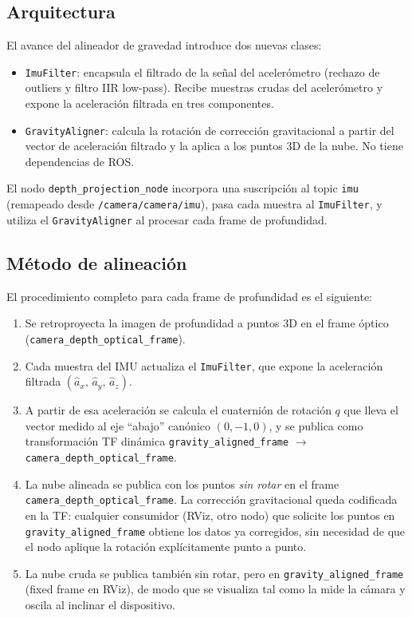 \subsection{Arquitectura}

El avance del alineador de gravedad introduce dos nuevas clases:

\begin{itemize}
  \item \texttt{ImuFilter}: encapsula el filtrado de la señal del
        acelerómetro (rechazo de outliers y filtro IIR low-pass). Recibe
        muestras crudas del acelerómetro y expone la aceleración filtrada
        en tres componentes.
  \item \texttt{GravityAligner}: calcula la rotación de corrección
        gravitacional a partir del vector de aceleración filtrado y la
        aplica a los puntos 3D de la nube. No tiene dependencias de ROS.
\end{itemize}

El nodo \texttt{depth\_projection\_node} incorpora una suscripción al
topic \texttt{imu} (remapeado desde \texttt{/camera/camera/imu}), pasa
cada muestra al \texttt{ImuFilter}, y utiliza el \texttt{GravityAligner}
al procesar cada frame de profundidad.

\subsection{Método de alineación}

El procedimiento completo para cada frame de profundidad es el siguiente:

\begin{enumerate}
  \item Se retroproyecta la imagen de profundidad a puntos 3D en el frame
        óptico (\texttt{camera\_depth\_optical\_frame}).
  \item Cada muestra del IMU actualiza el \texttt{ImuFilter}, que expone la
        aceleración filtrada $(\hat{a}_x,\, \hat{a}_y,\, \hat{a}_z)$.
  \item A partir de esa aceleración se calcula el cuaternión de rotación $q$
        que lleva el vector medido al eje ``abajo'' canónico $(0, -1, 0)$, y
        se publica como transformación TF dinámica
        \texttt{gravity\_aligned\_frame} $\to$ \texttt{camera\_depth\_optical\_frame}.
  \item La nube alineada se publica con los puntos \emph{sin rotar} en el frame
        \texttt{camera\_depth\_optical\_frame}. La corrección gravitacional
        queda codificada en la TF: cualquier consumidor (RViz, otro nodo) que
        solicite los puntos en \texttt{gravity\_aligned\_frame} obtiene los
        datos ya corregidos, sin necesidad de que el nodo aplique la rotación
        explícitamente punto a punto.
  \item La nube cruda se publica también sin rotar, pero en
        \texttt{gravity\_aligned\_frame} (fixed frame en RViz), de modo que
        se visualiza tal como la mide la cámara y oscila al inclinar el
        dispositivo.
\end{enumerate}

